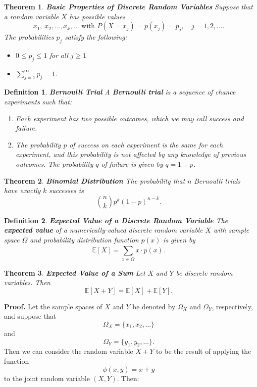 \documentclass[letterpaper,10pt]{article}
\newcommand{\Sum}[2]{\ensuremath{\sum\limits}_{#1}^{#2}}
\newtheorem{thm}{Theorem}
\newtheorem{df}{Definition}[section]
\begin{document}
\begin{thm}{\bf Basic Properties of Discrete Random Variables}
Suppose that a random variable $X$ has possible values $$x_1,~x_2,\ldots,x_k,\ldots\text{ with }P(X=x_j)=p(x_j)=p_j,\quad j=1,2,\ldots.$$  The probabilities $p_j$ satisfy the following:

\begin{itemize}

\item $0\leq p_j\leq 1$ for all $j\geq 1$

\item $\displaystyle\Sum{j=1}{\infty}p_j=1$.

\end{itemize}

\end{thm}

\begin{df}{\bf Bernoulli Trial}
A {\bf Bernoulli trial} is a sequence of chance experiments such that:
\begin{enumerate}
\item Each experiment has two possible outcomes, which we may call success and failure.
\item The probability $p$ of success on each experiment is the same for each experiment, and this probability is not affected by any knowledge of previous outcomes. The probability $q$ of failure is given by $q=1-p$.
\end{enumerate}
\end{df}

\begin{thm}{\bf Binomial Distribution}
The probability that $n$ Bernoulli trials have exactly $k$ successes is $${n\choose k}p^k(1-p)^{n-k}.$$
\end{thm}


\begin{df}{\bf Expected Value of a Discrete Random Variable}
The {\bf expected value} of a numerically-valued discrete random variable $X$ with sample space $\Omega$ and probability distribution function $p(x)$ is given by $$\mathbb{E}[X]=\Sum{x\in \Omega}{}x\cdot p(x).$$
\end{df}

\begin{thm}{\bf Expected Value of a Sum}
Let $X$ and $Y$ be discrete random variables.  Then $$\mathbb{E}[X+Y]=\mathbb{E}[X]+\mathbb{E}[Y].$$
\end{thm}

\noindent\textbf{Proof.} Let the sample spaces of $X$ and $Y$ be denoted by $\Omega_X$ and $\Omega_Y$, respectively, and suppose that $$\Omega_X=\{x_1,x_2,\ldots\}$$ and $$\Omega_Y=\{y_1,y_2,\ldots\}.$$  Then we can consider the random variable $X + Y$ to be the result of applying the function $$\phi(x, y) = x+y$$ to the joint random variable $(X, Y )$.  Then:
\end{document}
